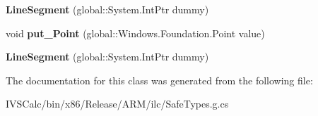 \begin{DoxyCompactItemize}
\item 
\mbox{\label{class_windows_1_1_u_i_1_1_xaml_1_1_media_1_1_line_segment_adbb35ad6a94127a1b7e648cbed2567c2}} 
{\bfseries Line\+Segment} (global\+::\+System.\+Int\+Ptr dummy)
\item 
\mbox{\label{class_windows_1_1_u_i_1_1_xaml_1_1_media_1_1_line_segment_afbdf9cc139beb78eee51b3e6d83eaef1}} 
void {\bfseries put\+\_\+\+Point} (global\+::\+Windows.\+Foundation.\+Point value)
\item 
\mbox{\label{class_windows_1_1_u_i_1_1_xaml_1_1_media_1_1_line_segment_adbb35ad6a94127a1b7e648cbed2567c2}} 
{\bfseries Line\+Segment} (global\+::\+System.\+Int\+Ptr dummy)
\end{DoxyCompactItemize}


The documentation for this class was generated from the following file\+:\begin{DoxyCompactItemize}
\item 
I\+V\+S\+Calc/bin/x86/\+Release/\+A\+R\+M/ilc/Safe\+Types.\+g.\+cs\end{DoxyCompactItemize}
